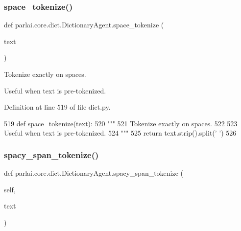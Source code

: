\subsubsection{\texorpdfstring{space\+\_\+tokenize()}{space\_tokenize()}}
{\footnotesize\ttfamily def parlai.\+core.\+dict.\+Dictionary\+Agent.\+space\+\_\+tokenize (\begin{DoxyParamCaption}\item[{}]{text }\end{DoxyParamCaption})\hspace{0.3cm}{\ttfamily [static]}}

\begin{DoxyVerb}Tokenize exactly on spaces.

Useful when text is pre-tokenized.
\end{DoxyVerb}
 

Definition at line 519 of file dict.\+py.


\begin{DoxyCode}
519     \textcolor{keyword}{def }space\_tokenize(text):
520         \textcolor{stringliteral}{"""}
521 \textcolor{stringliteral}{        Tokenize exactly on spaces.}
522 \textcolor{stringliteral}{}
523 \textcolor{stringliteral}{        Useful when text is pre-tokenized.}
524 \textcolor{stringliteral}{        """}
525         \textcolor{keywordflow}{return} text.strip().split(\textcolor{stringliteral}{' '})
526 
\end{DoxyCode}
\mbox{\label{classparlai_1_1core_1_1dict_1_1DictionaryAgent_a6532e92a69be5a68d04963597cd4ba29}} 
\subsubsection{\texorpdfstring{spacy\+\_\+span\+\_\+tokenize()}{spacy\_span\_tokenize()}}
{\footnotesize\ttfamily def parlai.\+core.\+dict.\+Dictionary\+Agent.\+spacy\+\_\+span\+\_\+tokenize (\begin{DoxyParamCaption}\item[{}]{self,  }\item[{}]{text }\end{DoxyParamCaption})}

